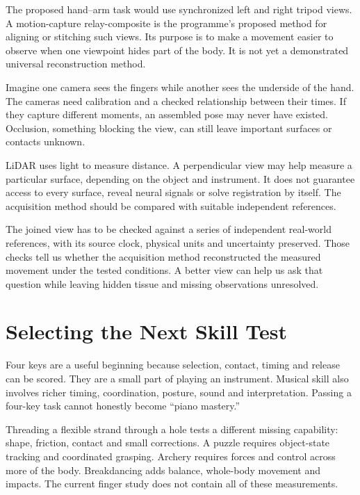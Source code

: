 The proposed hand--arm task would use synchronized left and right tripod views. A motion-capture relay-composite is the programme's proposed method for aligning or stitching such views. Its purpose is to make a movement easier to observe when one viewpoint hides part of the body. It is not yet a demonstrated universal reconstruction method.\par

Imagine one camera sees the fingers while another sees the underside of the hand. The cameras need calibration and a checked relationship between their times. If they capture different moments, an assembled pose may never have existed. Occlusion, something blocking the view, can still leave important surfaces or contacts unknown.\par

LiDAR uses light to measure distance. A perpendicular view may help measure a particular surface, depending on the object and instrument. It does not guarantee access to every surface, reveal neural signals or solve registration by itself. The acquisition method should be compared with suitable independent references.\par

The joined view has to be checked against a series of independent real-world references, with its source clock, physical units and uncertainty preserved. Those checks tell us whether the acquisition method reconstructed the measured movement under the tested conditions. A better view can help us ask that question while leaving hidden tissue and missing observations unresolved.\par

\section{Selecting the Next Skill Test}

Four keys are a useful beginning because selection, contact, timing and release can be scored. They are a small part of playing an instrument. Musical skill also involves richer timing, coordination, posture, sound and interpretation. Passing a four-key task cannot honestly become ``piano mastery.''\par

Threading a flexible strand through a hole tests a different missing capability: shape, friction, contact and small corrections. A puzzle requires object-state tracking and coordinated grasping. Archery requires forces and control across more of the body. Breakdancing adds balance, whole-body movement and impacts. The current finger study does not contain all of these measurements.\par

